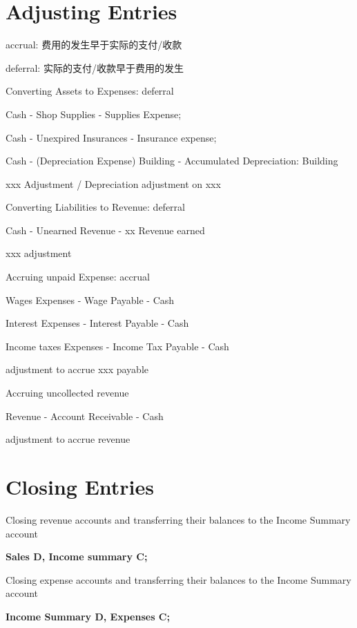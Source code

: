 \documentclass[10pt, a4paper]{article}
\begin{document}
\section*{Adjusting Entries}

accrual: 费用的发生早于实际的支付/收款

deferral: 实际的支付/收款早于费用的发生

\medskip

Converting Assets to Expenses: deferral

\quad Cash - Shop Supplies - Supplies Expense;  

\quad Cash - Unexpired Insurances - Insurance expense; 

\quad Cash - (Depreciation Expense) Building - Accumulated Depreciation: Building

\quad xxx Adjustment / Depreciation adjustment on xxx

\medskip

Converting Liabilities to Revenue: deferral 

\quad Cash - Unearned Revenue - xx Revenue earned 

\quad xxx adjustment 

\medskip 

Accruing unpaid Expense: accrual 

\quad Wages Expenses - Wage Payable - Cash

\quad Interest Expenses - Interest Payable - Cash 

\quad Income taxes Expenses - Income Tax Payable - Cash 

\quad adjustment to accrue xxx payable 

\medskip 

Accruing uncollected revenue 

\quad Revenue - Account Receivable - Cash 

\quad adjustment to accrue revenue                                

\section*{Closing Entries}

Closing revenue accounts and transferring their balances to the Income Summary account 

\textbf{Sales D, Income summary C;}

Closing expense accounts and transferring their balances to the Income Summary account

\textbf{Income Summary D, Expenses C;}
\end{document}
